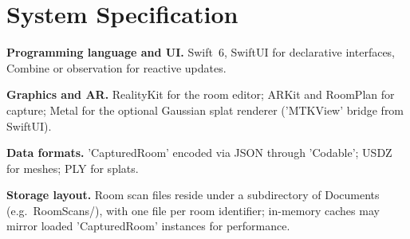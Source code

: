 \section{System Specification}
\label{sec:system_spec}

\textbf{Programming language and UI.} Swift~6, SwiftUI for declarative interfaces, Combine or observation for reactive updates.

\textbf{Graphics and AR.} RealityKit for the room editor; ARKit and RoomPlan for capture; Metal for the optional Gaussian splat renderer ('MTKView' bridge from SwiftUI).

\textbf{Data formats.} 'CapturedRoom' encoded via JSON through 'Codable'; USDZ for meshes; PLY for splats.

\textbf{Storage layout.} Room scan files reside under a subdirectory of Documents (e.g.\ RoomScans/), with one file per room identifier; in-memory caches may mirror loaded 'CapturedRoom' instances for performance.


